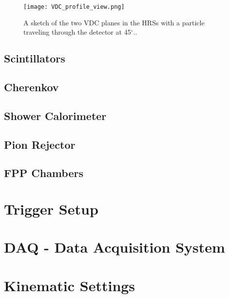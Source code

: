 	\cite{drift}
	
	
	\begin{figure}
	\centering
	
	\texttt{[image: VDC\_profile\_view.png]}
	
	\caption{A sketch of the two VDC planes in the HRSs with a particle traveling through the detector at 45$^\circ$.\cite{drift}.
	\label{VDC_profile}}
	\end{figure}
	
	
	
	
	
	\subsection{Scintillators}	\subsection{Cherenkov}
	\subsection{Shower Calorimeter}
	\subsection{Pion Rejector}
	\subsection{FPP Chambers}

\section{Trigger Setup}
\section{DAQ - Data Acquisition System}

\section{Kinematic Settings}









